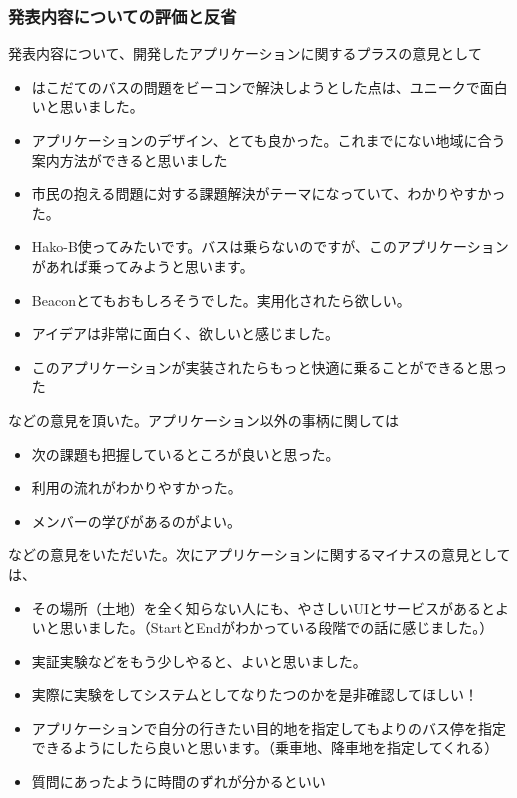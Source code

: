 \documentclass[openany,11pt,papersize]{jsbook}
\begin{document}

\subsubsection{発表内容についての評価と反省}
発表内容について、開発したアプリケーションに関するプラスの意見として
\begin{itemize}

\item はこだてのバスの問題をビーコンで解決しようとした点は、ユニークで面白いと思いました。
\item アプリケーションのデザイン、とても良かった。これまでにない地域に合う案内方法ができると思いました
\item 市民の抱える問題に対する課題解決がテーマになっていて、わかりやすかった。
\item Hako-B使ってみたいです。バスは乗らないのですが、このアプリケーションがあれば乗ってみようと思います。
\item Beaconとてもおもしろそうでした。実用化されたら欲しい。
\item アイデアは非常に面白く、欲しいと感じました。
\item このアプリケーションが実装されたらもっと快適に乗ることができると思った

\end{itemize}
などの意見を頂いた。アプリケーション以外の事柄に関しては
\begin{itemize}

\item 次の課題も把握しているところが良いと思った。
\item 利用の流れがわかりやすかった。
\item メンバーの学びがあるのがよい。

\end{itemize}
などの意見をいただいた。次にアプリケーションに関するマイナスの意見としては、
\begin{itemize}

\item その場所（土地）を全く知らない人にも、やさしいUIとサービスがあるとよいと思いました。（StartとEndがわかっている段階での話に感じました。）
\item 実証実験などをもう少しやると、よいと思いました。
\item 実際に実験をしてシステムとしてなりたつのかを是非確認してほしい！
\item アプリケーションで自分の行きたい目的地を指定してもよりのバス停を指定できるようにしたら良いと思います。（乗車地、降車地を指定してくれる）
\item 質問にあったように時間のずれが分かるといい

\end{itemize}
\end{document}
